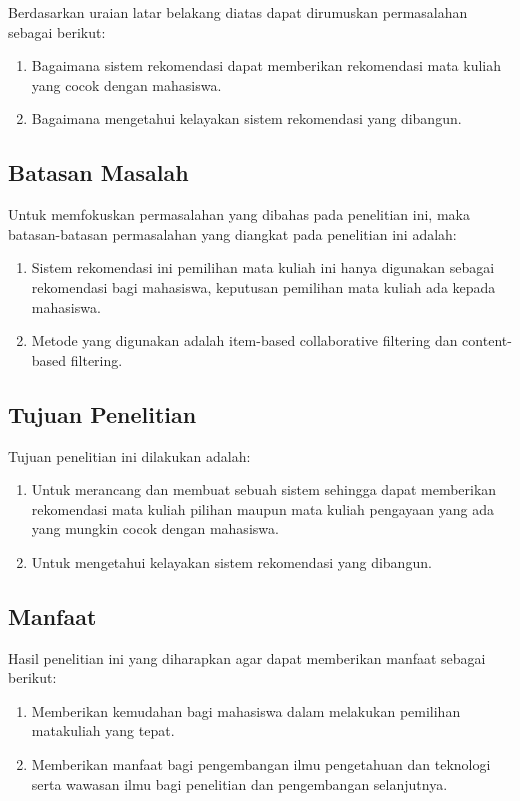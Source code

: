 Berdasarkan uraian latar belakang diatas dapat dirumuskan permasalahan sebagai berikut:
\begin{enumerate}
      \setlength\itemsep{0em}
      \item Bagaimana sistem rekomendasi dapat memberikan rekomendasi mata kuliah yang cocok dengan mahasiswa.
      \item Bagaimana mengetahui kelayakan sistem rekomendasi yang dibangun.
\end{enumerate}

\subsection{Batasan Masalah}
Untuk memfokuskan permasalahan yang dibahas pada penelitian ini, maka batasan-batasan permasalahan yang
diangkat pada penelitian ini adalah:
\begin{enumerate}
      \setlength\itemsep{0em}
      \item Sistem rekomendasi ini pemilihan mata kuliah
            ini hanya digunakan sebagai rekomendasi bagi
            mahasiswa, keputusan pemilihan mata kuliah
            ada kepada mahasiswa.
      \item Metode yang digunakan adalah item-based
            collaborative filtering dan content-based
            filtering.
\end{enumerate}

\subsection{Tujuan Penelitian}
Tujuan penelitian ini dilakukan adalah:
\begin{enumerate}
      \setlength\itemsep{0em}
      \item Untuk merancang dan membuat sebuah sistem sehingga dapat memberikan rekomendasi mata kuliah pilihan
            maupun mata kuliah pengayaan yang ada yang mungkin cocok dengan mahasiswa.
      \item Untuk
            mengetahui kelayakan sistem rekomendasi yang dibangun.
\end{enumerate}

\subsection{Manfaat}
Hasil penelitian ini yang diharapkan agar dapat memberikan manfaat sebagai berikut:
\begin{enumerate}
      \setlength\itemsep{0em}
      \item Memberikan kemudahan bagi mahasiswa dalam melakukan pemilihan matakuliah yang tepat.
      \item Memberikan manfaat bagi pengembangan ilmu pengetahuan dan teknologi serta wawasan ilmu bagi
            penelitian dan pengembangan selanjutnya.
\end{enumerate}